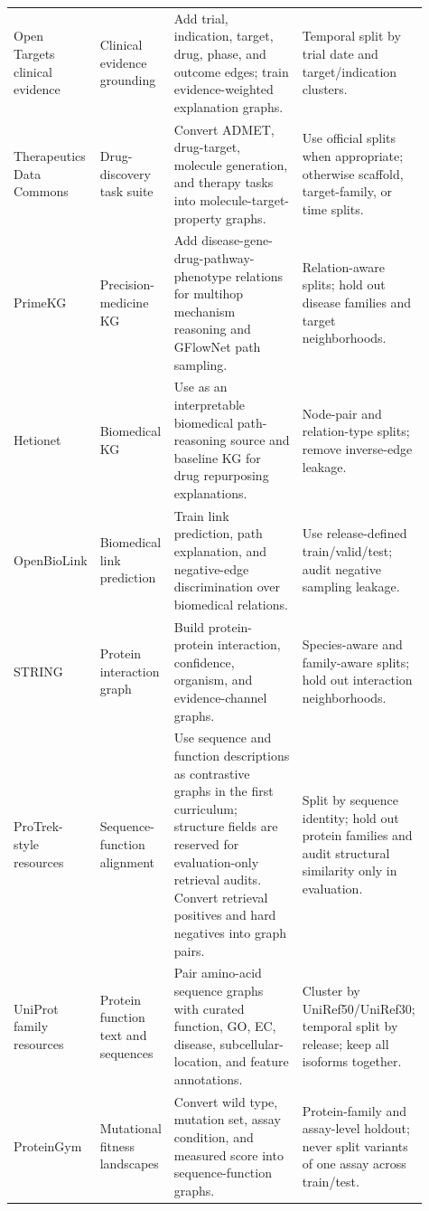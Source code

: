 \documentclass[11pt]{article}
\newcommand{\1}{\mathbf{1}}
\begin{document}
{\begin{longtable}{p{0.17\linewidth}p{0.16\linewidth}p{0.36\linewidth}p{0.22\linewidth}}
Open Targets clinical evidence \cite{OpenTargetsClinicalEvidence2026} & Clinical evidence grounding & Add trial, indication, target, drug, phase, and outcome edges; train evidence-weighted explanation graphs. & Temporal split by trial date and target/indication clusters. \\
Therapeutics Data Commons \cite{TDC2021} & Drug-discovery task suite & Convert ADMET, drug-target, molecule generation, and therapy tasks into molecule-target-property graphs. & Use official splits when appropriate; otherwise scaffold, target-family, or time splits. \\
PrimeKG \cite{PrimeKG2023} & Precision-medicine KG & Add disease-gene-drug-pathway-phenotype relations for multihop mechanism reasoning and GFlowNet path sampling. & Relation-aware splits; hold out disease families and target neighborhoods. \\
Hetionet \cite{Hetionet2017} & Biomedical KG & Use as an interpretable biomedical path-reasoning source and baseline KG for drug repurposing explanations. & Node-pair and relation-type splits; remove inverse-edge leakage. \\
OpenBioLink \cite{OpenBioLink2020} & Biomedical link prediction & Train link prediction, path explanation, and negative-edge discrimination over biomedical relations. & Use release-defined train/valid/test; audit negative sampling leakage. \\
STRING \cite{STRING2023} & Protein interaction graph & Build protein-protein interaction, confidence, organism, and evidence-channel graphs. & Species-aware and family-aware splits; hold out interaction neighborhoods. \\
ProTrek-style resources \cite{ProTrek2025} & Sequence-function alignment & Use sequence and function descriptions as contrastive graphs in the first curriculum; structure fields are reserved for evaluation-only retrieval audits. Convert retrieval positives and hard negatives into graph pairs. & Split by sequence identity; hold out protein families and audit structural similarity only in evaluation. \\
UniProt family resources \cite{UniProt2025,UniRef2025} & Protein function text and sequences & Pair amino-acid sequence graphs with curated function, GO, EC, disease, subcellular-location, and feature annotations. & Cluster by UniRef50/UniRef30; temporal split by release; keep all isoforms together. \\
ProteinGym \cite{ProteinGym2023} & Mutational fitness landscapes & Convert wild type, mutation set, assay condition, and measured score into sequence-function graphs. & Protein-family and assay-level holdout; never split variants of one assay across train/test. \\

\end{longtable}}
\end{document}
